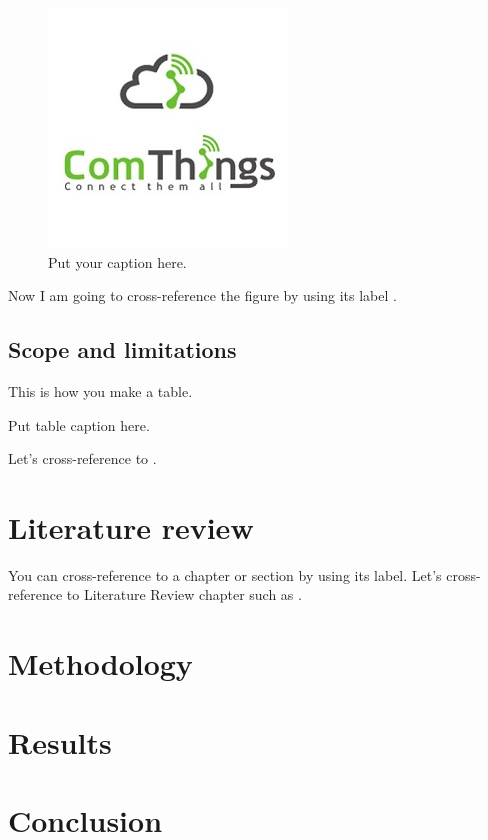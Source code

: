 \documentclass{template}
\begin{document}
\begin{figure}
\caption{Put your caption here.}
\label{fig:logo}
\includegraphics[scale=0.2]{logo}
\end{figure}

Now I am going to cross-reference the figure by using its label .

\section{Scope and limitations}

This is how you make a table.

\begin{table}
\caption{Put table caption here.}
\label{tab:city}
\end{table}

Let's cross-reference to .

\chapter{Literature review}\label{ch:lr}

You can cross-reference to a chapter or section by using its label. Let's cross-reference to Literature Review chapter such as .

\chapter{Methodology}\label{ch:me}
\chapter{Results}\label{ch:re}
\chapter{Conclusion}\label{ch:co}

\appendix %
\end{document}
